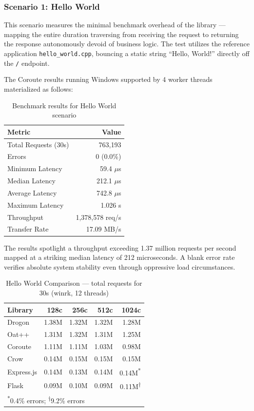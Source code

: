 \subsubsection{Scenario 1: Hello World}

This scenario measures the minimal benchmark overhead of the library --- mapping the entire duration traversing from receiving the request to returning the response autonomously devoid of business logic. The test utilizes the reference application \texttt{hello\_world.cpp}, bouncing a static string ``Hello, World!'' directly off the \texttt{/} endpoint.

The Coroute results running Windows supported by 4 worker threads materialized as follows:

\begin{table}[H]
\centering
\caption{Benchmark results for Hello World scenario}
\label{tab:hello_world_benchmark}
\begin{tabular}{|l|r|}
\hline
\textbf{Metric} & \textbf{Value} \\
\hline
Total Requests (30s) & 763,193 \\
Errors & 0 (0.0\%) \\
Minimum Latency & 59.4 $\mu$s \\
Median Latency & 212.1 $\mu$s \\
Average Latency & 742.8 $\mu$s \\
Maximum Latency & 1.026 s \\
Throughput & 1,378,578 req/s \\
Transfer Rate & 17.09 MB/s \\
\hline
\end{tabular}
\end{table}

The results spotlight a throughput exceeding 1.37 million requests per second mapped at a striking median latency of 212 microseconds. A blank error rate verifies absolute system stability even through oppressive load circumstances.

\begin{table}[H]
\centering
\caption{Hello World Comparison --- total requests for 30s (winrk, 12 threads)}
\label{tab:hello_world_comparison}
\begin{tabular}{|l|r|r|r|r|}
\hline
\textbf{Library} & \textbf{128c} & \textbf{256c} & \textbf{512c} & \textbf{1024c} \\
\hline
Drogon & 1.38M & 1.32M & 1.32M & 1.28M \\
Oat++ & 1.31M & 1.32M & 1.31M & 1.25M \\
Coroute & 1.11M & 1.11M & 1.03M & 0.98M \\
Crow & 0.14M & 0.15M & 0.15M & 0.15M \\
Express.js & 0.14M & 0.13M & 0.14M & 0.14M\textsuperscript{*} \\
Flask & 0.09M & 0.10M & 0.09M & 0.11M\textsuperscript{†} \\
\hline
\multicolumn{5}{l}{\rule{0pt}{3ex}\textsuperscript{*}\footnotesize 0.4\% errors; \textsuperscript{†}\footnotesize 9.2\% errors} \\
\end{tabular}
\end{table}


